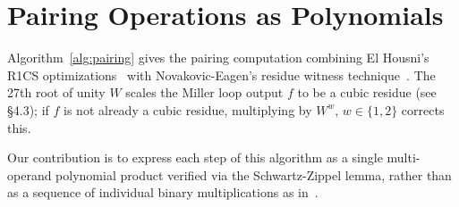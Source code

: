 \section{Pairing Operations as Polynomials}

Algorithm~\ref{alg:pairing} gives the pairing computation combining El Housni's R1CS optimizations~\cite{ACNS:ElHousni23} with Novakovic-Eagen's residue witness technique~\cite{EPRINT:NovEag24}. The 27th root of unity $W$ scales the Miller loop output $f$ to be a cubic residue (see~\cite{EPRINT:NovEag24} §4.3); if $f$ is not already a cubic residue, multiplying by $W^w$, $w\in\{1,2\}$ corrects this.

Our contribution is to express each step of this algorithm as a single multi-operand polynomial product verified via the Schwartz-Zippel lemma, rather than as a sequence of individual binary multiplications as in~\cite{FXFM23}.


